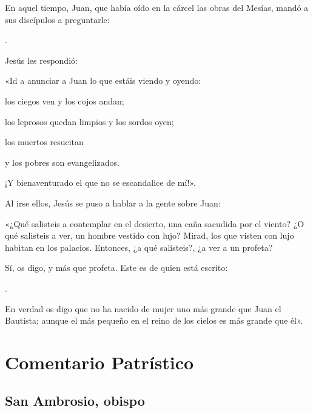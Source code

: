 		\begin{scripture}
			En aquel tiempo, Juan, que había oído en la cárcel las obras del Mesías, mandó a sus discípulos a preguntarle:
			
			. 
			
			Jesús les respondió: 
			
			«Id a anunciar a Juan lo que estáis viendo y oyendo:
			
			los ciegos ven y los cojos andan;
			
			los leprosos quedan limpios y los sordos oyen;
			
			los muertos resucitan 
			
			y los pobres son evangelizados. 
			
			¡Y bienaventurado el que no se escandalice de mí!». 
			
			Al irse ellos, Jesús se puso a hablar a la gente sobre Juan: 
			
			«¿Qué salisteis a contemplar en el desierto, una caña sacudida por el viento? ¿O qué salisteis a ver, un hombre vestido con lujo? Mirad, los que visten con lujo habitan en los palacios. Entonces, ¿a qué salisteis?, ¿a ver a un profeta? 
			
			Sí, os digo, y más que profeta. Este es de quien está escrito: 
			
			. 
			
			En verdad os digo que no ha nacido de mujer uno más grande que Juan el Bautista; aunque el más pequeño en el reino de los cielos es más grande que él».
		\end{scripture}

	\newsection 
	
	\section{Comentario Patrístico}

		\subsection{San Ambrosio, obispo}


			

